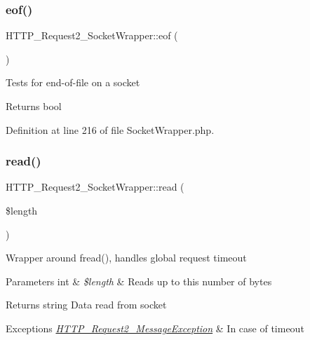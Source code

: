 \subsubsection{\texorpdfstring{eof()}{eof()}}
{\footnotesize\ttfamily H\+T\+T\+P\+\_\+\+Request2\+\_\+\+Socket\+Wrapper\+::eof (\begin{DoxyParamCaption}{ }\end{DoxyParamCaption})}

Tests for end-\/of-\/file on a socket

\begin{DoxyReturn}{Returns}
bool 
\end{DoxyReturn}


Definition at line 216 of file Socket\+Wrapper.\+php.

\hypertarget{classHTTP__Request2__SocketWrapper_a5e483244689fefacb4b774fde087c60d}{}\label{classHTTP__Request2__SocketWrapper_a5e483244689fefacb4b774fde087c60d} 
\subsubsection{\texorpdfstring{read()}{read()}}
{\footnotesize\ttfamily H\+T\+T\+P\+\_\+\+Request2\+\_\+\+Socket\+Wrapper\+::read (\begin{DoxyParamCaption}\item[{}]{\$length }\end{DoxyParamCaption})}

Wrapper around fread(), handles global request timeout


\begin{DoxyParams}[1]{Parameters}
int & {\em \$length} & Reads up to this number of bytes\\
\hline
\end{DoxyParams}
\begin{DoxyReturn}{Returns}
string Data read from socket 
\end{DoxyReturn}

\begin{DoxyExceptions}{Exceptions}
{\em \hyperlink{classHTTP__Request2__MessageException}{H\+T\+T\+P\+\_\+\+Request2\+\_\+\+Message\+Exception}} & In case of timeout \\
\hline
\end{DoxyExceptions}


